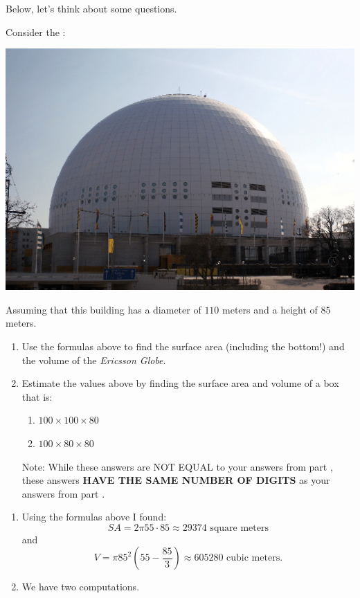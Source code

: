 \documentclass[nooutcomes,noauthor]{ximera}
\begin{document}
Below, let's think about some questions. 


\mynewpage





\begin{question}
  Consider the :
   \begin{center}
    \includegraphics[width=.4\textwidth]{dome.png} %
   \end{center}
   Assuming that this building has a diameter of $110$ meters and a
   height of $85$ meters.
   \begin{enumerate}
   \item Use the formulas above to find the surface area (including
     the bottom!) and the volume of the \textit{Ericsson Globe}.
   \item Estimate the values above by finding the surface area and
     volume of a box that is:
     \begin{enumerate}
     \item $100\times 100 \times 80$
     \item $100\times 80 \times 80$
     \end{enumerate}
   Note: While these answers are NOT EQUAL to your answers from
   part \label{FG1:1}, these answers \textbf{HAVE THE SAME NUMBER OF
     DIGITS} as your answers from part \label{FG1:1}.
   \end{enumerate}
   \begin{freeResponse}
     \begin{enumerate}
     \item Using the formulas above I found:
       \[
       SA = 2\pi 55\cdot 85 \approx 29374 \text{ square meters}
       \]
       and
       \[
       V = \pi85^2 \left(55-\frac{85}{3}\right)\approx  605280 \text{ cubic meters}.
       \]
     \item We have two computations.
       \begin{enumerate}

\end{enumerate}
\end{enumerate}
\end{freeResponse}
\end{question}
\end{document}
